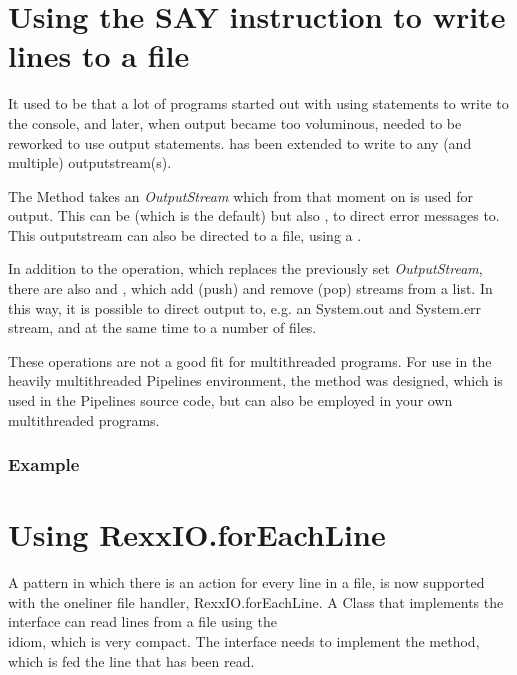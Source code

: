 {\section{Using the SAY instruction to write lines to a file}
It used to be that a lot of programs started out with using
 statements to write to the console, and later, when
output became too voluminous, needed to be reworked to use output
statements.  has been extended to write to any (and
multiple) outputstream(s).

The  Method takes an \emph{OutputStream} which
from that moment on is used for output. This can be
 (which is the default) but also
, to direct error messages to. This outputstream
can also be directed to a file, using a .

In addition to the  operation, which
replaces the previously set \emph{OutputStream}, there are
also  and ,
which add (push) and remove (pop) streams from a list. In this way, it
is possible to direct output to, e.g. an System.out and System.err
stream, and at the same time to a number of files.

These operations are not a good fit for multithreaded programs. For
use in the heavily multithreaded Pipelines environment, the method
 was designed, which is used in the Pipelines
source code, but can also be employed in your own multithreaded programs.
\subsubsection{Example}



\section{Using RexxIO.forEachLine }

A pattern in which there is an action for every line in a file, is now supported with the oneliner
file handler, RexxIO.forEachLine. A Class that implements the
interface  can read lines from a file using the \\
 idiom, which is
very compact. The  interface needs to implement
the  method, which is fed the line that has been read.

}
